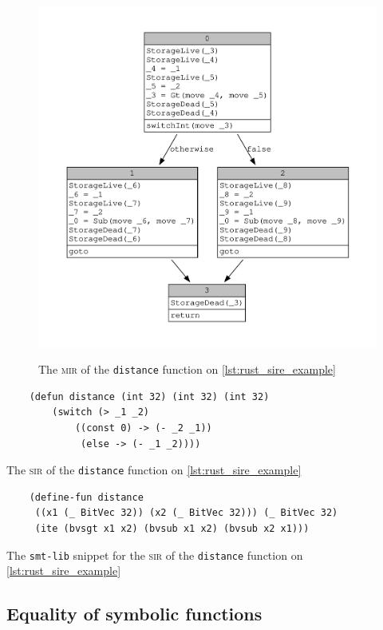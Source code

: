 \begin{figure}[ht]
    \centering
    \includegraphics[height=12cm]{images/distance.pdf}
    \caption{The \textsc{mir} of the \texttt{distance} function on \ref{lst:rust_sire_example}}
  \label{lst:mir_sire_example}
\end{figure}

\begin{listing}[ht]
    \begin{verbatim}
    (defun distance (int 32) (int 32) (int 32) 
        (switch (> _1 _2) 
            ((const 0) -> (- _2 _1)) 
             (else -> (- _1 _2))))
    \end{verbatim}
    \caption{The \textsc{sir} of the \texttt{distance} function on \ref{lst:rust_sire_example}}
  \label{lst:sir_sire_example}
\end{listing}

\begin{listing}[ht]
    \begin{verbatim}
    (define-fun distance 
     ((x1 (_ BitVec 32)) (x2 (_ BitVec 32))) (_ BitVec 32) 
     (ite (bvsgt x1 x2) (bvsub x1 x2) (bvsub x2 x1)))
    \end{verbatim}
    \caption{The \texttt{smt-lib} snippet for the \textsc{sir} of the \texttt{distance} function on \ref{lst:rust_sire_example}}
  \label{lst:smt_sire_example}
\end{listing}


\subsection{Equality of symbolic functions}

